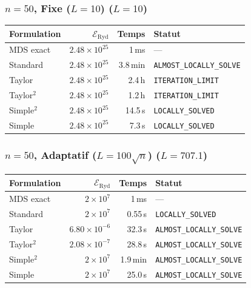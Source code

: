 \subsubsection{$n=50$, Fixe ($L{=}10$) ($L=10$)}
\begin{longtable}{@{}lrrl@{}}
  \toprule
  Formulation & $\mathcal{E}_{\mathrm{Ryd}}$ & Temps & Statut \\
  \midrule
  \endhead
  MDS exact & $2.48\times10^{25}$ & 1\,ms & --- \\
  Standard & $2.48\times10^{25}$ & 3.8\,min & \texttt{ALMOST\_LOCALLY\_SOLVE} \\
  Taylor & $2.48\times10^{25}$ & 2.4\,h & \texttt{ITERATION\_LIMIT} \\
  Taylor$^2$ & $2.48\times10^{25}$ & 1.2\,h & \texttt{ITERATION\_LIMIT} \\
  Simple$^2$ & $2.48\times10^{25}$ & 14.5\,s & \texttt{LOCALLY\_SOLVED} \\
  Simple & $2.48\times10^{25}$ & 7.3\,s & \texttt{LOCALLY\_SOLVED} \\
  \bottomrule
\end{longtable}

\subsubsection{$n=50$, Adaptatif ($L{=}100\sqrt{n}$) ($L=707.1$)}
\begin{longtable}{@{}lrrl@{}}
  \toprule
  Formulation & $\mathcal{E}_{\mathrm{Ryd}}$ & Temps & Statut \\
  \midrule
  \endhead
  MDS exact & $2\times10^{7}$ & 1\,ms & --- \\
  Standard & $2\times10^{7}$ & 0.55\,s & \texttt{LOCALLY\_SOLVED} \\
  Taylor & $6.80\times10^{-6}$ & 32.3\,s & \texttt{ALMOST\_LOCALLY\_SOLVE} \\
  Taylor$^2$ & $2.08\times10^{-7}$ & 28.8\,s & \texttt{ALMOST\_LOCALLY\_SOLVE} \\
  Simple$^2$ & $2\times10^{7}$ & 1.9\,min & \texttt{ALMOST\_LOCALLY\_SOLVE} \\
  Simple & $2\times10^{7}$ & 25.0\,s & \texttt{ALMOST\_LOCALLY\_SOLVE} \\
  \bottomrule
\end{longtable}

